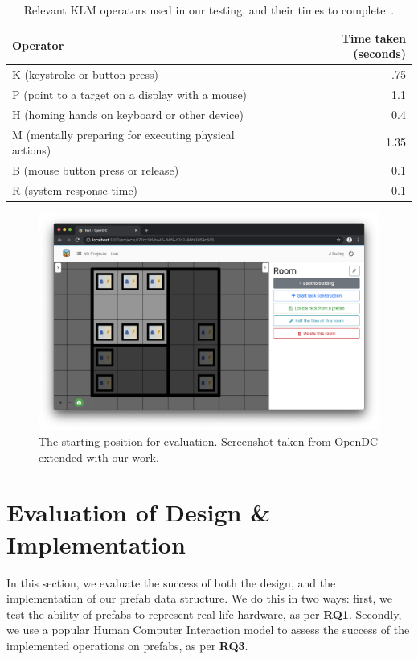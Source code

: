 \documentclass[11pt]{article}
\begin{document}
\begin{table}[]
\centering
	\begin{tabular}{lr}
	\toprule
	Operator                                              & Time taken (seconds) \\ \midrule
	K (keystroke or button press)                         & .75                  \\
	P (point to a target on a display with a mouse)       & 1.1                  \\
	H (homing hands on keyboard or other device)          & 0.4                  \\
	M (mentally preparing for executing physical actions) & 1.35                 \\
	B (mouse button press or release)                     & 0.1                  \\
	R (system response time)							  &	   0.1                  \\
	\bottomrule
	\end{tabular}
\caption[Relevant KLM operators used in our testing, and their times to complete]{Relevant KLM operators used in our testing, and their times to complete~\cite{Newell1980}.}
\label{tab:3}
\end{table}


\begin{figure}[]
	\centering
	\includegraphics[width=\textwidth]{frontendstartingpoint.png}
	\caption[The starting position for evaluation]{The starting position for evaluation. Screenshot taken from OpenDC extended with our work.}
	\label{fig:evalstart}
\end{figure}

\section{Evaluation of Design \& Implementation} \label{sec:evaluation}
	In this section, we evaluate the success of both the design, and the implementation of our prefab data structure.
	We do this in two ways: first, we test the ability of prefabs to represent real-life hardware, as per \textbf{RQ1}.
	Secondly, we use a popular Human Computer Interaction model to assess the success of the implemented operations on prefabs, as per \textbf{RQ3}.
\end{document}
